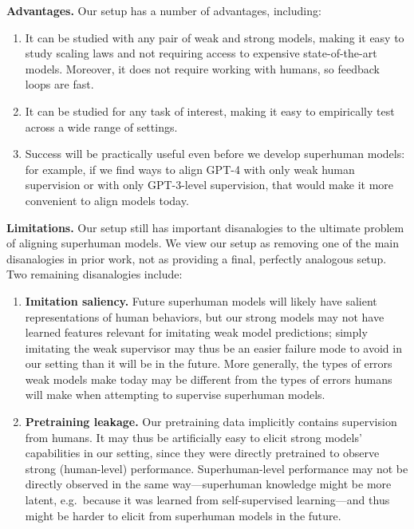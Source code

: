 \textbf{Advantages.}\quad
Our setup has a number of advantages, including:

\begin{enumerate}
    \item It can be studied with any pair of weak and strong models, making it easy to study scaling laws and not requiring access to expensive state-of-the-art models. Moreover, it does not require working with humans, so feedback loops are fast. 
    \item It can be studied for any task of interest, making it easy to empirically test across a wide range of settings.
    \item Success will be practically useful even before we develop superhuman models: for example, if we find ways to align GPT-4 with only weak human supervision or with only GPT-3-level supervision, that would make it more convenient to align models today.
\end{enumerate}

\textbf{Limitations.}\quad
Our setup still has important disanalogies to the ultimate problem of aligning superhuman models. We view our setup as removing one of the main disanalogies in prior work, not as providing a final, perfectly analogous setup. Two remaining disanalogies include:

\begin{enumerate}
    \item \textbf{Imitation saliency.} Future superhuman models will likely have salient representations of human behaviors, but our strong models may not have learned features relevant for imitating weak model predictions; simply imitating the weak supervisor may thus be an easier failure mode to avoid in our setting than it will be in the future. More generally, the types of errors weak models make today may be different from the types of errors humans will make when attempting to supervise superhuman models.
    \item \textbf{Pretraining leakage.} Our pretraining data implicitly contains supervision from humans. It may thus be artificially easy to elicit strong models' capabilities in our setting, since they were directly pretrained to observe strong (human-level) performance. Superhuman-level performance may not be directly observed in the same way---superhuman knowledge might be more latent, e.g.~because it was learned from self-supervised learning---and thus might be harder to elicit from superhuman models in the future. 
\end{enumerate}

